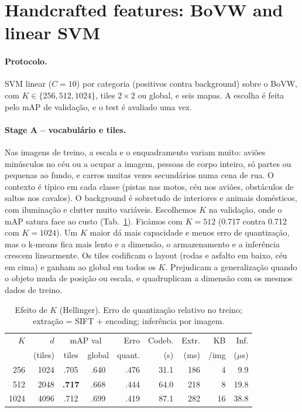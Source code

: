 \section{Handcrafted features: BoVW and linear SVM}
\label{sec:part1}

\paragraph{Protocolo.}
SVM linear ($C=10$) por categoria (positivos contra background) sobre o BoVW,
com $K\in\{256,512,1024\}$, tiles $2\times2$ ou global, e seis mapas. A
escolha é feita pelo mAP de validação, e o test é avaliado uma vez.

\paragraph{Stage A -- vocabulário e tiles.}
Nas imagens de treino, a escala e o enquadramento variam muito: aviões
minúsculos no céu ou a ocupar a imagem, pessoas de corpo inteiro, só partes ou
pequenas ao fundo, e carros muitas vezes secundários numa cena de rua. O
contexto é típico em cada classe (pistas nas motos, céu nos aviões, obstáculos
de saltos nos cavalos). O background é sobretudo de interiores e animais
domésticos, com iluminação e clutter muito variáveis. Escolhemos $K$ na validação, onde o mAP satura face ao custo
(Tab.~\ref{tab:part1-k}). Ficámos com $K=512$ (0.717 contra 0.712 com
$K=1024$). Um $K$ maior dá mais capacidade e menos erro de quantização, mas o
k-means fica mais lento e a dimensão, o armazenamento e a inferência crescem
linearmente. Os tiles codificam o layout (rodas e asfalto em baixo, céu em
cima) e ganham ao global em todos os $K$. Prejudicam a generalização quando o
objeto muda de posição ou escala, e quadruplicam a dimensão com os mesmos
dados de treino.

\begin{table}[t]
\centering
\caption{Efeito de $K$ (Hellinger). Erro de quantização relativo no treino;
extração = SIFT + encoding; inferência por imagem.}
\label{tab:part1-k}
\small
\setlength{\tabcolsep}{3pt}
\begin{tabular}{rrccrrrrr}
\toprule
$K$ & $d$ & \multicolumn{2}{c}{mAP val} & Erro & Codeb. & Extr. & KB & Inf. \\
 & (tiles) & tiles & global & quant. & (s) & (ms) & /img & ($\mu$s) \\
\midrule
256  & 1024 & .705 & .640 & .476 & 31.1 & 186 & 4  & 9.9 \\
512  & 2048 & \textbf{.717} & .668 & .444 & 64.0 & 218 & 8  & 19.8 \\
1024 & 4096 & .712 & .699 & .419 & 87.1 & 282 & 16 & 38.8 \\
\bottomrule
\end{tabular}
\end{table}

